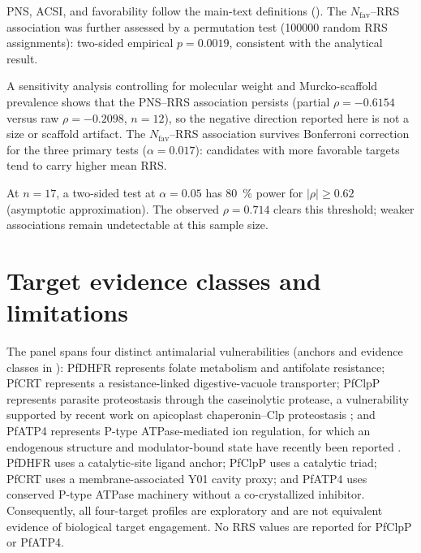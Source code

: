 \documentclass[11pt,a4paper]{article}
\begin{document}
	PNS, ACSI, and favorability follow the main-text definitions (). The $N_{\mathrm{fav}}$--RRS association was further assessed by a permutation test (\num{100000} random RRS assignments): two-sided empirical $p=\num{0.0019}$, consistent with the analytical result.
	
	A sensitivity analysis controlling for molecular weight and Murcko-scaffold prevalence shows that the PNS--RRS association persists (partial $\rho=-\num{0.6154}$ versus raw $\rho=-\num{0.2098}$, $n=\num{12}$), so the negative direction reported here is not a size or scaffold artifact. The $N_{\mathrm{fav}}$--RRS association survives Bonferroni correction for the three primary tests ($\alpha=\num{0.017}$): candidates with more favorable targets tend to carry higher mean RRS.
	
	At $n=\num{17}$, a two-sided test at $\alpha=\num{0.05}$ has \qty{80}{\percent} power for $|\rho|\geq\num{0.62}$ (asymptotic approximation). The observed $\rho=\num{0.714}$ clears this threshold; weaker associations remain undetectable at this sample size.
	
	
	
	\section{Target evidence classes and limitations}\label{sec:sm_evidence}
	The panel spans four distinct antimalarial vulnerabilities (anchors and evidence classes in ): PfDHFR represents folate metabolism and antifolate resistance; PfCRT represents a resistance-linked digestive-vacuole transporter; PfClpP represents parasite proteostasis through the caseinolytic protease, a vulnerability supported by recent work on apicoplast chaperonin--Clp proteostasis \cite{Tissawak2025}; and PfATP4 represents P-type ATPase-mediated ion regulation, for which an endogenous structure and modulator-bound state have recently been reported \cite{Haile2025}. PfDHFR uses a catalytic-site ligand anchor; PfClpP uses a catalytic triad; PfCRT uses a membrane-associated Y01 cavity proxy; and PfATP4 uses conserved P-type ATPase machinery without a co-crystallized inhibitor. Consequently, all four-target profiles are exploratory and are not equivalent evidence of biological target engagement. No RRS values are reported for PfClpP or PfATP4.
	
\end{document}
